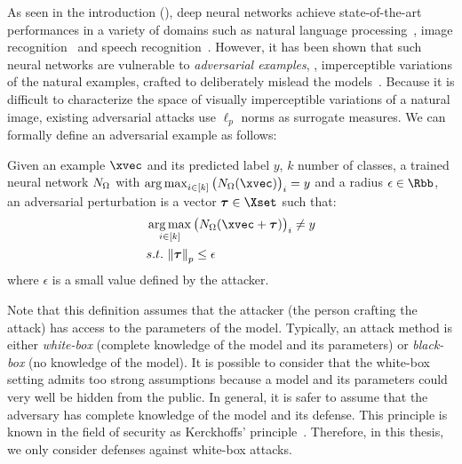As seen in the introduction (), deep neural networks achieve state-of-the-art performances in a variety of domains such as natural language processing~\cite{radford2019language}, image recognition~\cite{he2016deep} and speech recognition~\cite{hinton2012deep}.
However, it has been shown that such neural networks are vulnerable to \emph{adversarial examples}, \ie, imperceptible variations of the natural examples, crafted to deliberately mislead the models~\cite{globerson2006nightmare,biggio2013evasion,szegedy2013intriguing}.
Because it is difficult to characterize the space of visually imperceptible variations of a natural image, existing adversarial attacks use $\ell_p$ norms as surrogate measures.
We can formally define an adversarial example as follows:
\begin{definition}
  Given an example $\xvec$ and its predicted label $y$, $k$ number of classes, a trained neural network $N_\Omega$ with $\argmax_{i \in [k]} \big( \nn_\weights(\xvec) \big)_i = y$ and a radius $\epsilon \in \Rbb$, an adversarial perturbation is a vector $\adv \in \Xset$ such that:
  \begin{align}
    &\argmax_{i \in [k]} \big( \nn_\weights (\xvec + \adv) \big)_i \neq y \\
    &\st\ \norm{\adv}_p \leq \epsilon \notag
  \end{align}
  where $\epsilon$ is a small value defined by the attacker.
\end{definition}

Note that this definition assumes that the attacker (the person crafting the attack) has access to the parameters of the model.
Typically, an attack method is either \emph{white-box} (complete knowledge of the model and its parameters) or \emph{black-box} (no knowledge of the model).
It is possible to consider that the white-box setting admits too strong assumptions because a model and its parameters could very well be hidden from the public.
In general, it is safer to assume that the adversary has complete knowledge of the model and its defense.
This principle is known in the field of security as Kerckhoffs’ principle~\cite{kerckhoffs1883cryptographie}.
Therefore, in this thesis, we only consider defenses against white-box attacks. %


